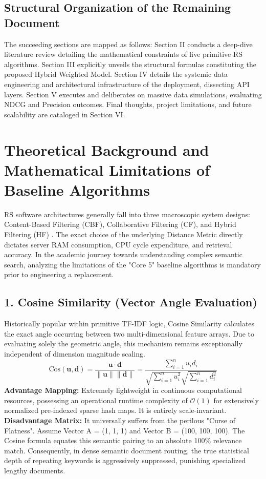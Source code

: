 \documentclass[journal]{IEEEtran}
\begin{document}
\subsection{Structural Organization of the Remaining Document}
The succeeding sections are mapped as follows: 
Section II conducts a deep-dive literature review detailing the mathematical constraints of five primitive RS algorithms. 
Section III explicitly unveils the structural formulas constituting the proposed Hybrid Weighted Model. 
Section IV details the systemic data engineering and architectural infrastructure of the deployment, dissecting API layers. 
Section V executes and deliberates on massive data simulations, evaluating NDCG and Precision outcomes. 
Final thoughts, project limitations, and future scalability are cataloged in Section VI.

\sectionsection{}
\section{Theoretical Background and Mathematical Limitations of Baseline Algorithms}
\label{sec:background}

RS software architectures generally fall into three macroscopic system designs: 
Content-Based Filtering (CBF), Collaborative Filtering (CF), and Hybrid Filtering (HF) \cite{deeplearningrs2019}. 
The exact choice of the underlying Distance Metric directly dictates server RAM consumption, CPU cycle expenditure, and retrieval accuracy. 
In the academic journey towards understanding complex semantic search, analyzing the limitations of the "Core 5" baseline algorithms is mandatory prior to engineering a replacement.

\subsection{1. Cosine Similarity (Vector Angle Evaluation)}

Historically popular within primitive TF-IDF logic, Cosine Similarity calculates the exact angle occurring between two multi-dimensional feature arrays. 
Due to evaluating solely the geometric angle, this mechanism remains exceptionally independent of dimension magnitude scaling.
\begin{equation}
\label{eq:cosine_baseline}
\text{Cos}(\mathbf{u}, \mathbf{d}) = \frac{\mathbf{u} \cdot \mathbf{d}}{\|\mathbf{u}\| \|\mathbf{d}\|} = \frac{\sum_{i=1}^{n} u_i d_i}{\sqrt{\sum_{i=1}^{n} u_i^2}\sqrt{\sum_{i=1}^{n} d_i^2}}
\end{equation}
\textbf{Advantage Mapping:} Extremely lightweight in continuous computational resources, possessing an operational runtime complexity of $\mathcal{O}(1)$ for extensively normalized pre-indexed sparse hash maps. It is entirely scale-invariant. \\
\textbf{Disadvantage Matrix:} It universally suffers from the perilous "Curse of Flatness". Assume Vector A = (1, 1, 1) and Vector B = (100, 100, 100). The Cosine formula equates this semantic pairing to an absolute 100\% relevance match. Consequently, in dense semantic document routing, the true statistical depth of repeating keywords is aggressively suppressed, punishing specialized lengthy documents.
\end{document}
